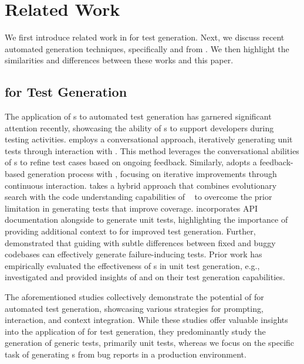 \section{Related Work}
\label{sec:relatedwork}

We first introduce related work in \llm for test generation. 
Next, we discuss recent automated \brt generation techniques, specifically \libro and \sweagentplus from \swtbench. 
We then highlight the similarities and differences between these works and this paper.

\subsection{\llm for Test Generation}
\label{sec:relatedwork:llmtestgen}

The application of \llm{}s to automated test generation has garnered significant attention recently, showcasing the ability of \llm{}s to support developers during testing activities. 
\citet{yuan2023no} employs a conversational approach, iteratively generating unit tests through interaction with \chatgpt. 
This method leverages the conversational abilities of \llm{}s to refine test cases based on ongoing feedback. 
Similarly, \citet{xie2023chatunitest} adopts a feedback-based generation process with \chatgpt, focusing on iterative improvements through continuous interaction.
\citet{lemieux2023codamosa} takes a hybrid approach that combines evolutionary search with the code understanding capabilities of \codex~\cite{chen2021evaluating} to overcome the prior limitation in generating tests that improve coverage.  
\citet{schafer2023empirical} incorporates API documentation alongside \gptthreepfive to generate unit tests, highlighting the importance of providing additional context to \llm for improved test generation.
Further, \citet{li2023nuances} demonstrated that guiding \chatgpt with subtle differences between fixed and buggy codebases can effectively generate failure-inducing tests. 
Prior work has empirically evaluated the effectiveness of \llm{}s in unit test generation, e.g., \citet{siddiq2023exploring} investigated and provided insights of \gptthreepfive and \codex on their test generation capabilities. 

The aforementioned studies collectively demonstrate the potential of \llm for automated test generation, showcasing various strategies for prompting, interaction, and context integration.
While these studies offer valuable insights into the application of \llm for test generation, they predominantly study the generation of generic tests, primarily unit tests, whereas we focus on the specific task of generating \brt{}s from bug reports in a production environment.

